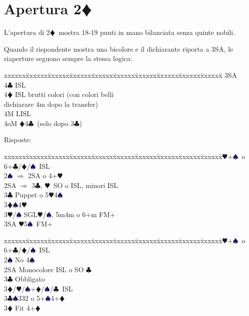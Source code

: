 \documentclass[a4paper,italian]{article}
\newcommand{\BC}{\textcolor{OliveGreen}{$\clubsuit$}}
\newcommand{\BD}{\textcolor{RedOrange}{$\vardiamondsuit$}}
\newcommand{\BH}{\textcolor{Red2}{$\varheartsuit${}}}
\newcommand{\BS}{\textcolor{MidnightBlue}{$\spadesuit${}}}
\newcommand{\pdfd}{\texorpdfstring{\BD{}}{D}}
\newenvironment{bidtable}
{\begin{tabbing}

    xxxxxx\=xxxxxx\=xxxxxx\=xxxxxx\=xxxxxx\=xxxxxx\=xxxxxx\=xxxxxx\=xxxxxx\=xxxxxx\=\kill}
{\end{tabbing} }%
\newenvironment{sviluppi}
{\begin{tcolorbox}[colframe=azzurro,title=Sviluppi particolari]}
    {
\end{tcolorbox} }%
\begin{document}
\newpage

\section{Apertura 2\pdfd}

\begin{multicols}{2}
    L'apertura di 2\BD\ mostra 18-19 punti in mano bilanciata senza quinte nobili.

    \begin{sviluppi}
        Quando il rispondente mostra una bicolore e il dichiarante riporta a 3SA, le riaperture seguono sempre la stessa logica:

        \begin{bidtable}\label{Riapertura3SA}
            3SA\+\\
            4\BC {} ISL\\
            4\BD {} ISL brutti colori (con colori belli\+\\ dichiarare 4m dopo la transfer)\-\\
            4M  LISL\\
            4oM \BD4\BC\ (solo dopo 3\BC)
        \end{bidtable}
    \end{sviluppi}
    Risposte:
    \begin{bidtable}
        2\BH {}+\BS\ o 6+\BC /\BD /\BS\ ISL\\
        2\BS \> $\Rightarrow$ 2SA o 4+\BH \\
        2SA \> $\Rightarrow$ 3\BC , \BH\ SO o ISL, minori ISL\\
        3\BC \> Puppet o 5\BH 4\BS \\
        3\BD {}\BS 4\BH \\
        3\BH/\BS \> SGL\BH /\BS , 5m4m o 6+m FM+\\
        3SA \BH 5\BS\ FM+
    \end{bidtable}
    \bigbreak
    \begin{bidtable}
        2\BH {}+\BS\ o 6+\BC /\BD /\BS\ ISL\+\\
        2\BS \> No 4\BS \+\\
        2SA \> Monocolore ISL o SO \BC \+\\
        3\BC \> Obbligato\+\\
        3\BD/\BH/\BS {}+\BD /\BS /\BC\ ISL\-\-\\
        3\BC {}\BS 332 o 5+\BS 4+\BD \+\\
        3\BD \> Fit 4+\BD \+\\

\end{bidtable}
\end{multicols}
\end{document}
